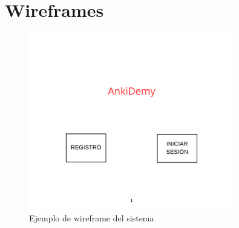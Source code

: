 \documentclass{report}
\begin{document}
\chapter{Wireframes}

\begin{figure}[H]
    \centering
    \includegraphics[width=0.8\textwidth]{./Diagramas/1.png}
    \caption{Ejemplo de wireframe del sistema}
\end{figure}
\end{document}
